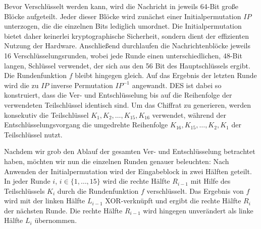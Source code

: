 Bevor Verschlüsselt werden kann, wird die Nachricht in jeweils 64-Bit große Blöcke aufgeteilt. Jeder dieser Blöcke wird zunächst einer Initialpermutation $IP$ unterzogen, die die einzelnen Bits lediglich umordnet. Die Initialpermutation bietet daher keinerlei kryptographische Sicherheit, sondern dient der effizienten Nutzung der Hardware. Anschließend durchlaufen die Nachrichtenblöcke jeweils 16 Verschlüsselungsrunden, wobei jede Runde  einen unterschiedlichen, 48-Bit langen, Schlüssel verwendet, der sich aus den 56 Bit des Hauptschlüssels ergibt. Die Rundenfunktion $f$ bleibt hingegen gleich. Auf das Ergebnis der letzten Runde wird die zu $IP$ inverse Permutation $IP^{-1}$ angewandt.
%
DES ist dabei so konstruiert, dass die Ver- und Entschlüsselung bis auf die Reihenfolge der verwendeten Teilschlüssel identisch sind. Um das Chiffrat zu generieren, werden konsekutiv die Teilschlüssel $K_1,K_2,\ldots,K_{15},K_{16}$ verwendet, während der Entschlüsselungsvorgang die umgedrehte Reihenfolge $K_{16},K_{15},\ldots,K_2,K_1$ der Teilschlüssel nutzt.

Nachdem wir grob den Ablauf der gesamten Ver- und Entschlüsselung betrachtet haben, möchten wir nun die einzelnen Runden genauer beleuchten: Nach Anwenden der Initialpermutation wird der Eingabeblock in zwei Hälften geteilt. In jeder Runde $i$, $i \in \{1,\ldots,15\}$ wird die rechte Hälfte $R_{i-1}$ mit Hilfe des Teilschlüssels $K_i$ durch die Rundenfunktion $f$ verschlüsselt. Das Ergebnis von $f$ wird mit der linken Hälfte $L_{i-1}$ XOR-verknüpft und ergibt die rechte Hälfte $R_i$ der nächsten Runde. Die rechte Hälfte $R_{i-1}$ wird hingegen unverändert als linke Hälfte $L_{i}$ übernommen.


